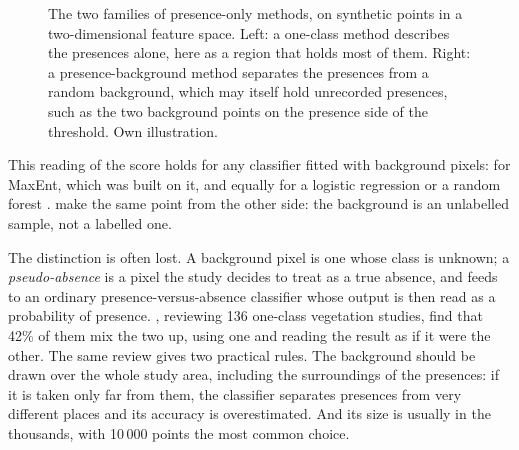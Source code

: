 \begin{figure}[htb]
\centering
{}
\caption{The two families of presence-only methods, on synthetic points
in a two-dimensional feature space. Left: a one-class method describes
the presences alone, here as a region that holds most of them. Right: a
presence-background method separates the presences from a random
background, which may itself hold unrecorded presences, such as the two
background points on the presence side of the threshold. Own
illustration.}
\label{fig:background-po-methods}
\end{figure}

This reading of the score holds for any classifier fitted with
background pixels: for MaxEnt, which was built on it, and equally for a
logistic regression or a random forest \cite{phillips2006}.
\citet{phillips2009} make the same point from the other side: the
background is an unlabelled sample, not a labelled one.

The distinction is often lost. A background pixel is one whose class
is unknown; a \emph{pseudo-absence} is a pixel the study decides to
treat as a true absence, and feeds to an ordinary
presence-versus-absence classifier whose output is then read as a
probability of presence. \citet{rapinel2021}, reviewing 136 one-class
vegetation studies, find that 42\% of them mix the two up, using one
and reading the result as if it were the other. The same review gives
two practical rules. The background should be drawn over the whole
study area, including the surroundings of the presences: if it is
taken only far from them, the classifier separates presences from very
different places and its accuracy is overestimated. And its size is
usually in the thousands, with 10\,000 points the most common choice.

